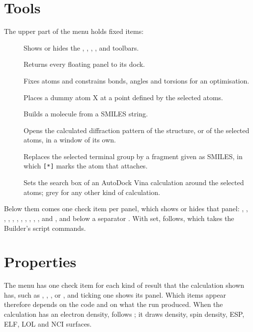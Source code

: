 \section{Tools}
The upper part of the  menu holds fixed items:
\begin{description}
	\item[] Shows or hides the , , , ,  and  toolbars.
	\item[] Returns every floating panel to its dock.
	\item[] Fixes atoms and constrains bonds, angles and torsions for an optimisation.
	\item[] Places a dummy atom X at a point defined by the selected atoms.
	\item[] Builds a molecule from a SMILES string.
	\item[] Opens the calculated diffraction pattern of the structure, or of the selected atoms, in a window of its own.
	\item[] Replaces the selected terminal group by a fragment given as SMILES, in which \texttt{[*]} marks the atom that attaches.
	\item[] Sets the search box of an AutoDock Vina calculation around the selected atoms; grey for any other kind of calculation.
\end{description}
Below them comes one check item per panel, which shows or hides that panel: , , , , , , , , , , ,  and , and below a separator . With  set,  follows, which takes the Builder's script commands.

\section{Properties}
The  menu has one check item for each kind of result that the calculation shown has, such as , , ,  or , and ticking one shows its panel. Which items appear therefore depends on the code and on what the run produced. When the calculation has an electron density,  follows ; it draws density, spin density, ESP, ELF, LOL and NCI surfaces.

